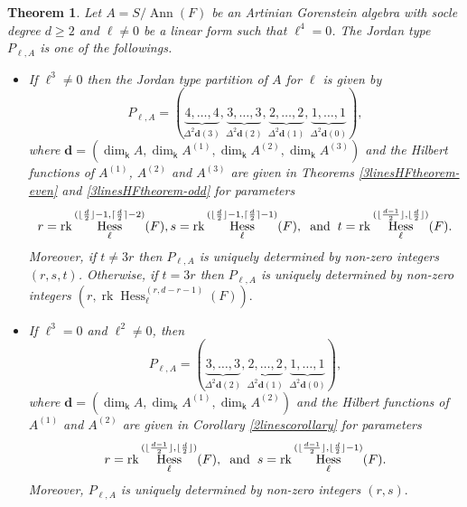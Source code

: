 \documentclass[12pt]{amsart}
\numberwithin{equation}{section}
\theoremstyle{plain} \newtheorem{theorem}{Theorem}[section]
\theoremstyle{definition} \newtheorem{definition}[theorem]{Definition}
\DeclareMathOperator{\Hess}{Hess}\DeclareMathOperator{\rk}{rk}
\DeclareMathOperator{\ann}{Ann}\DeclareMathOperator{\Char}{char}
\begin{document}
\begin{theorem}\label{JT-theorem}
Let $A=S/\ann(F)$ be an Artinian  Gorenstein algebra with socle degree $d\geq 2$ and  $\ell\neq 0$ be a linear form such that $\ell^4=0$. The Jordan type $P_{\ell,A}$ is one of the followings.
\begin{itemize}
\item If $\ell^3\neq 0$ then the Jordan type partition of $A$ for $\ell$ is given by 
\begin{equation}\label{JT4}
P_{\ell,A}=(\underbrace{4,\dots ,4}_{\Delta^2\mathbf{d}(3)},\underbrace{3,\dots ,3}_{\Delta^2\mathbf{d}(2)}, \underbrace{2,\dots ,2}_{\Delta^2\mathbf{d}(1)},\underbrace{1,\dots ,1}_{\Delta^2\mathbf{d}(0)}),
\end{equation}
where $\mathbf{d}=(\dim_\mathsf{k} A,\dim_\mathsf{k} A^{(1)},\dim_\mathsf{k} A^{(2)}, \dim_\mathsf{k} A^{(3)})$ and the Hilbert functions of $A^{(1)}$, $A^{(2)}$ and $A^{(3)}$ are given in Theorems  \ref{3linesHFtheorem-even} and  \ref{3linesHFtheorem-odd} for parameters $$r=\rk\Hess_\ell^{(\lfloor\frac{d}{2}\rfloor-1, \lceil\frac{d}{2}\rceil-2)}(F), s=\rk\Hess_\ell^{(\lfloor\frac{d}{2}\rfloor-1, \lceil\frac{d}{2}\rceil-1)}(F), \hspace*{2mm} \text{and} \hspace*{2mm} t=\rk\Hess_\ell^{(\lfloor\frac{d-1}{2}\rfloor, \lfloor\frac{d}{2}\rfloor)}(F).$$ 
\noindent Moreover, if $t\neq 3r$ then $P_{\ell,A}$ is uniquely determined by non-zero integers $(r,s,t)$. Otherwise, if $t=3r$ then $P_{\ell,A}$ is uniquely determined by non-zero integers \linebreak$(r,\rk\Hess_\ell^{(r,d-r-1)}(F)).$

\item If $\ell^3=0$ and $\ell^2\neq 0$, then 
\begin{equation}\label{JT3}
P_{\ell,A}=(\underbrace{3,\dots ,3}_{\Delta^2\mathbf{d}(2)},\underbrace{2,\dots ,2}_{\Delta^2\mathbf{d}(1)}, \underbrace{1,\dots ,1}_{\Delta^2\mathbf{d}(0)}),
\end{equation}
where $\mathbf{d}=(\dim_\mathsf{k} A,\dim_\mathsf{k} A^{(1)},\dim_\mathsf{k} A^{(2)})$ and the Hilbert functions of $A^{(1)}$ and $A^{(2)}$ are given in Corollary \ref{2linescorollary} for parameters  $$r=\rk\Hess_\ell^{(\lfloor\frac{d-1}{2}\rfloor, \lfloor\frac{d}{2}\rfloor)}(F),\hspace*{2mm} \text{and} \hspace*{2mm}  s=\rk\Hess_\ell^{(\lfloor\frac{d-1}{2}\rfloor, \lfloor\frac{d}{2}\rfloor-1)}(F).$$
 Moreover, $P_{\ell,A}$ is uniquely determined by non-zero integers $(r,s).$


\end{itemize}
\end{theorem}
\end{document}
